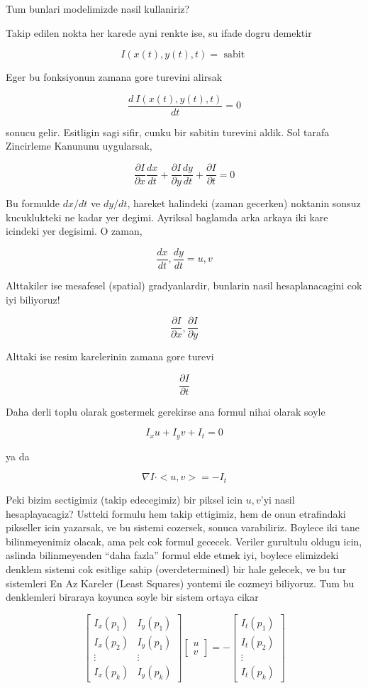 \documentclass[12pt,fleqn]{article}
\begin{document}
Tum bunlari modelimizde nasil kullaniriz? 

Takip edilen nokta her karede ayni renkte ise, su ifade dogru demektir 

\[ I(x(t),y(t),t) = \textrm{ sabit } \]

Eger bu fonksiyonun zamana gore turevini alirsak

\[ \frac{d \ I(x(t),y(t),t)}{dt} = 0\]

sonucu gelir. Esitligin sagi sifir, cunku bir sabitin turevini aldik. Sol
tarafa Zincirleme Kanununu uygularsak, 

\[ \frac{\partial I}{\partial x}\frac{dx}{dt} +
\frac{\partial I}{\partial y}\frac{dy}{dt} +
\frac{\partial I}{\partial t} = 0
\]

Bu formulde $dx/dt$ ve $dy/dt$, hareket halindeki (zaman gecerken) noktanin
sonsuz kucuklukteki ne kadar yer degimi. Ayriksal baglamda arka arkaya iki
kare icindeki yer degisimi. O zaman,

\[ \frac{dx}{dt}, \frac{dy}{dt} = u, v \]

Alttakiler ise mesafesel (spatial) gradyanlardir, bunlarin nasil
hesaplanacagini cok iyi biliyoruz! 

\[ 
\frac{\partial I}{\partial x}, \frac{\partial I}{\partial y}
 \]

Alttaki ise resim karelerinin zamana gore turevi

\[ 
\frac{\partial I}{\partial t}
 \]

Daha derli toplu olarak gostermek gerekirse ana formul nihai olarak soyle

\[ I_x u + I_y v + I_t = 0 \]

ya da

\[ 
\nabla I \cdot <u, v> = -I_t
 \]

Peki bizim sectigimiz (takip edecegimiz) bir piksel icin $u,v$'yi nasil
hesaplayacagiz? Ustteki formulu hem takip ettigimiz, hem de onun
etrafindaki pikseller icin yazarsak, ve bu sistemi cozersek, sonuca
varabiliriz. Boylece iki tane bilinmeyenimiz olacak, ama pek cok formul
gececek. Veriler gurultulu oldugu icin, aslinda bilinmeyenden ``daha
fazla'' formul elde etmek iyi, boylece elimizdeki denklem sistemi cok
esitlige sahip (overdetermined) bir hale gelecek, ve bu tur sistemleri En
Az Kareler (Least Squares) yontemi ile cozmeyi biliyoruz. Tum bu
denklemleri biraraya koyunca soyle bir sistem ortaya cikar

\[ 
\left[\begin{array}{cc}
I_x(p_1) & I_y(p_1) \\
I_x(p_2) & I_y(p_1) \\
\vdots & \vdots \\
I_x(p_k) & I_y(p_k) 
\end{array}\right]
\left[\begin{array}{r}
u \\
v
\end{array}\right] = 
-
\left[\begin{array}{c}
I_t(p_1) \\
I_t(p_2) \\
\vdots \\
I_t(p_k) 
\end{array}\right]
 \]
\end{document}
